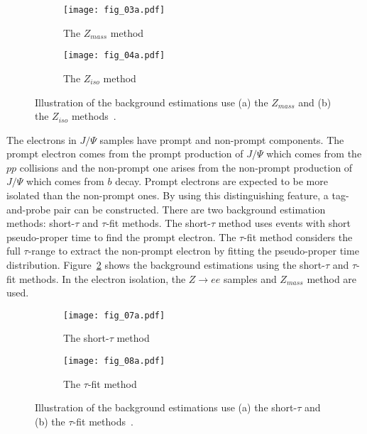 \begin{figure}[htbp]
    \begin{subfigure}[b]{0.48\textwidth}
        \begin{center}
            \texttt{[image: fig\_03a.pdf]}
            \caption{The $Z_{mass}$ method}
        \end{center}
    \end{subfigure}
    \begin{subfigure}[b]{0.48\textwidth}
        \begin{center}
            \texttt{[image: fig\_04a.pdf]}
            \caption{The $Z_{iso}$ method}
        \end{center}
    \end{subfigure}
    \caption{Illustration of the background estimations use (a) the $Z_{mass}$ and (b) the $Z_{iso}$ methods~\cite{ATLAS:2016iqc}.}
    \label{fig:app_electron_isolation_Zee_background_subtraction_methods}
\end{figure}

The electrons in $J/\Psi$ samples have prompt and non-prompt components.
The prompt electron comes from the prompt production of $J/\Psi$ which comes from the $pp$ collisions and the non-prompt one arises from the non-prompt production of $J/\Psi$ which comes from $b$ decay.
Prompt electrons are expected to be more isolated than the non-prompt ones.
By using this distinguishing feature, a tag-and-probe pair can be constructed.
There are two background estimation methods: short-$\tau$ and $\tau$-fit methods.
The short-$\tau$ method uses events with short pseudo-proper time to find the prompt electron.
The $\tau$-fit method considers the full $\tau$-range to extract the non-prompt electron by fitting the pseudo-proper time distribution.
Figure~\ref{fig:app_electron_isolation_JPsi_background_subtraction_methods} shows the background estimations using the short-$\tau$ and $\tau$-fit methods.
In the electron isolation, the $Z \to ee$ samples and $Z_{mass}$ method are used.

\begin{figure}[htbp]
    \begin{subfigure}[b]{0.48\textwidth}
        \begin{center}
            \texttt{[image: fig\_07a.pdf]}
            \caption{The short-$\tau$ method}
        \end{center}
    \end{subfigure}
    \begin{subfigure}[b]{0.48\textwidth}
        \begin{center}
            \texttt{[image: fig\_08a.pdf]}
            \caption{The $\tau$-fit method}
        \end{center}
    \end{subfigure}
    \caption{Illustration of the background estimations use (a) the short-$\tau$ and (b) the $\tau$-fit methods~\cite{Aaboud:2016vfy}.}
    \label{fig:app_electron_isolation_JPsi_background_subtraction_methods}
\end{figure}

